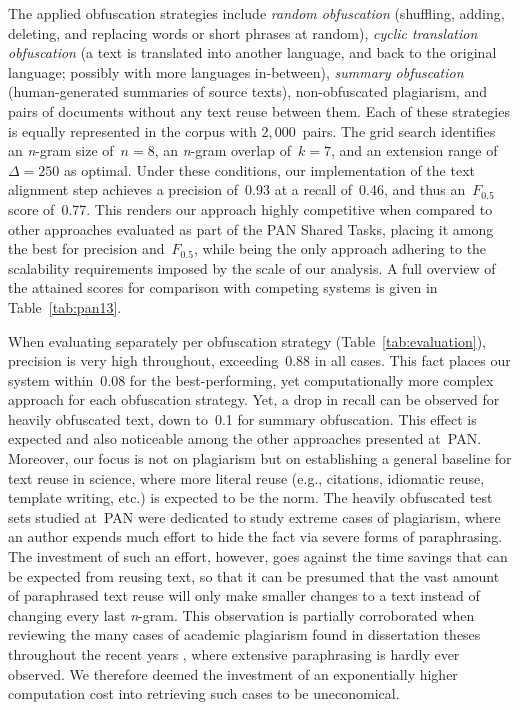 \documentclass[fleqn,10pt]{wlscirep}
\begin{document}
The applied obfuscation strategies include \emph{random obfuscation} (shuffling, adding, deleting, and replacing words or short phrases at random), \emph{cyclic translation obfuscation} (a text is translated into another language, and back to the original language; possibly with more languages in-between), \emph{summary obfuscation} (human-generated summaries of source texts), non-obfuscated plagiarism, and pairs of documents without any text reuse between them. Each of these strategies is equally represented in the corpus with $2,000$~pairs. The grid search identifies an \emph{n}-gram size of~$n = 8$, an \emph{n}-gram overlap of~$k = 7$, and an extension range of~$\Delta = 250$ as optimal. Under these conditions, our implementation of the text alignment step achieves a precision of~0.93 at a recall of~0.46, and thus an~$F_{0.5}$ score of~0.77. This renders our approach highly competitive when compared to other approaches evaluated as part of the PAN Shared Tasks, placing it among the best for precision and~$F_{0.5}$, while being the only approach adhering to the scalability requirements imposed by the scale of our analysis. A full overview of the attained scores for comparison with competing systems is given in Table~\ref{tab:pan13}.

When evaluating separately per obfuscation strategy (Table~\ref{tab:evaluation}), precision is very high throughout, exceeding~0.88 in all cases. This fact places our system within~0.08 for the best-performing, yet computationally more complex approach for each obfuscation strategy. Yet, a drop in recall can be observed for heavily obfuscated text, down to~0.1 for summary obfuscation. This effect is expected and also noticeable among the other approaches presented at~PAN. Moreover, our focus is not on plagiarism but on establishing a general baseline for text reuse in science, where more literal reuse (e.g., citations, idiomatic reuse, template writing, etc.) is expected to be the norm. The heavily obfuscated test sets studied at~PAN were dedicated to study extreme cases of plagiarism, where an author expends much effort to hide the fact via severe forms of paraphrasing. The investment of such an effort, however, goes against the time savings that can be expected from reusing text, so that it can be presumed that the vast amount of paraphrased text reuse will only make smaller changes to a text instead of changing every last \emph{n}-gram. This observation is partially corroborated when reviewing the many cases of academic plagiarism found in dissertation theses throughout the recent years \cite{vroniplag:2021}, where extensive paraphrasing is hardly ever observed. We therefore deemed the investment of an exponentially higher computation cost into retrieving such cases to be uneconomical.
\end{document}
